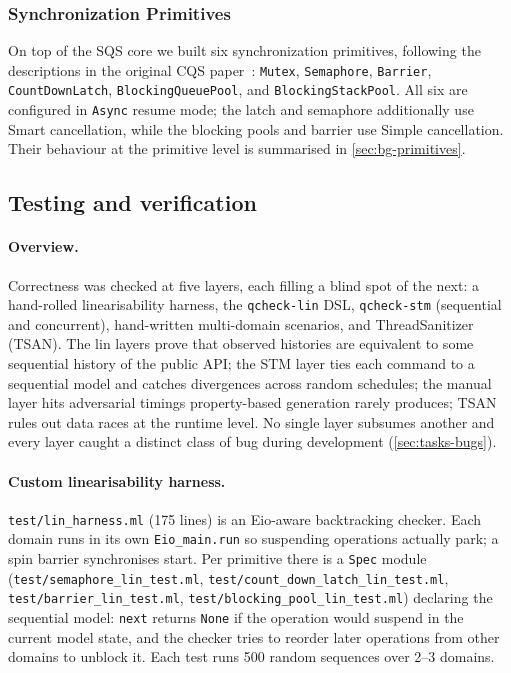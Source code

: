 \documentclass[11pt,a4paper]{article}
\begin{document}
\subsubsection{Synchronization Primitives}
\label{sec:impl-primitives}

On top of the SQS core we built six synchronization primitives,
following the descriptions in the original CQS
paper~\cite{koval2023cqs}: \texttt{Mutex}, \texttt{Semaphore},
\texttt{Barrier}, \texttt{CountDownLatch},
\texttt{BlockingQueuePool}, and \texttt{BlockingStackPool}. All six
are configured in \texttt{Async} resume mode; the latch and semaphore
additionally use Smart cancellation, while the blocking pools and
barrier use Simple cancellation. Their behaviour at the primitive
level is summarised in \cref{sec:bg-primitives}.

\subsection{Testing and verification}
\label{sec:tasks-test}

\paragraph{Overview.}
Correctness was checked at five layers, each filling a blind spot of
the next: a hand-rolled linearisability harness, the
\texttt{qcheck-lin} DSL, \texttt{qcheck-stm} (sequential and
concurrent), hand-written multi-domain scenarios, and ThreadSanitizer
(TSAN). The lin layers prove that observed histories are equivalent
to some sequential history of the public API; the STM layer ties each
command to a sequential model and catches divergences across random
schedules; the manual layer hits adversarial timings property-based
generation rarely produces; TSAN rules out data races at the runtime
level. No single layer subsumes another and every layer caught a
distinct class of bug during development (\cref{sec:tasks-bugs}).

\paragraph{Custom linearisability harness.}
\texttt{test/lin\_harness.ml} (175 lines) is an Eio-aware backtracking
checker. Each domain runs in its own \texttt{Eio\_main.run} so
suspending operations actually park; a spin barrier synchronises
start. Per primitive there is a \texttt{Spec} module
(\texttt{test/semaphore\_lin\_test.ml},
\texttt{test/count\_down\_latch\_lin\_test.ml},
\texttt{test/barrier\_lin\_test.ml},
\texttt{test/blocking\_pool\_lin\_test.ml}) declaring the sequential
model: \texttt{next} returns \texttt{None} if the operation would
suspend in the current model state, and the checker tries to reorder
later operations from other domains to unblock it. Each test runs 500
random sequences over 2--3 domains.
\end{document}
